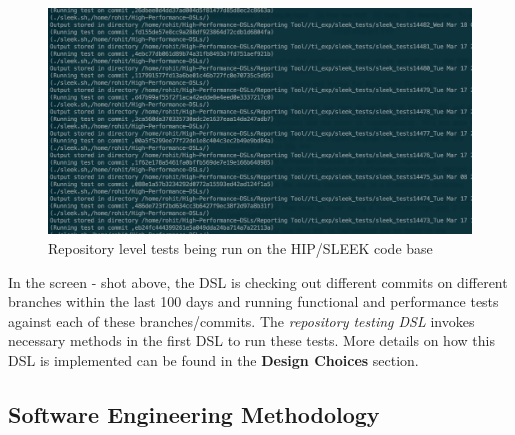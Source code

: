 \begin{figure}[H]
  \centering
    \includegraphics[width=500px]{figures/repo_testing.png}
  \caption{Repository level tests being run on the HIP/SLEEK code base}
\end{figure}

\noindent
In the screen - shot above, the DSL is checking out different commits on different branches within the last 100 days and running functional and performance tests against each of these branches/commits. The \textit{repository testing DSL} invokes necessary methods in the first DSL to run these tests. More details on how this DSL is implemented can be found in the \textbf{Design Choices} section.
\bigskip

\newpage
\subsection{Software Engineering Methodology}

